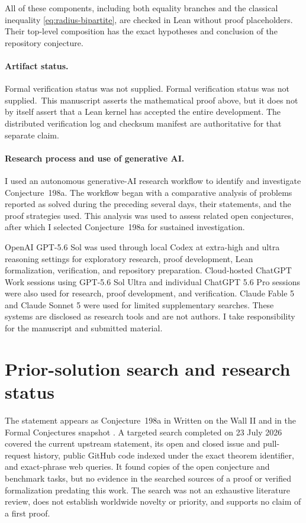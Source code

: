 \documentclass[10pt]{article}
\newcommand{\leanstatus}{Formal verification status was not supplied.}}
\theoremstyle{paperplain}
\begin{document}
All of these components, including both equality branches and the classical
inequality \eqref{eq:radius-bipartite}, are checked in Lean without proof
placeholders. Their top-level composition has the exact hypotheses and
conclusion of the repository conjecture.

\paragraph{Artifact status.}
\ifleanverified
\leanstatus
\else
\leanstatus\  This manuscript asserts the mathematical proof above,
but it does not by itself assert that a Lean kernel has accepted the
entire development.  The distributed verification log and checksum
manifest are authoritative for that separate claim.
\fi

\paragraph{Research process and use of generative AI.}
I used an autonomous generative-AI research workflow to identify and
investigate Conjecture~198a.  The workflow began with a comparative analysis
of problems reported as solved during the preceding several days, their
statements, and the proof strategies used.  This analysis was used to assess
related open conjectures, after which I selected Conjecture~198a for sustained
investigation.

OpenAI GPT-5.6 Sol was used through local Codex at extra-high and ultra
reasoning settings for exploratory research, proof development, Lean
formalization, verification, and repository preparation.  Cloud-hosted
ChatGPT Work sessions using GPT-5.6 Sol Ultra and individual ChatGPT 5.6 Pro
sessions were also used for research, proof development, and verification.
Claude Fable 5 and Claude Sonnet 5 were used for limited supplementary
searches.  These systems are disclosed as research tools and are not authors.
I take responsibility for the manuscript and submitted material.

\section*{Prior-solution search and research status}

The statement appears as Conjecture~198a in Written on the Wall II
\cite{DeLaVinaWOWII} and in the Formal Conjectures snapshot
\cite{FormalConjectures198a}.  A targeted search completed on 23 July
2026 covered the current upstream statement, its open and closed issue
and pull-request history, public GitHub code indexed under the exact
theorem identifier, and exact-phrase web queries.  It found copies of
the open conjecture and benchmark tasks, but no evidence in the searched
sources of a proof or verified formalization predating this work.  The
search was not an exhaustive literature review, does not establish
worldwide novelty or priority, and supports no claim of a first proof.



\end{document}
